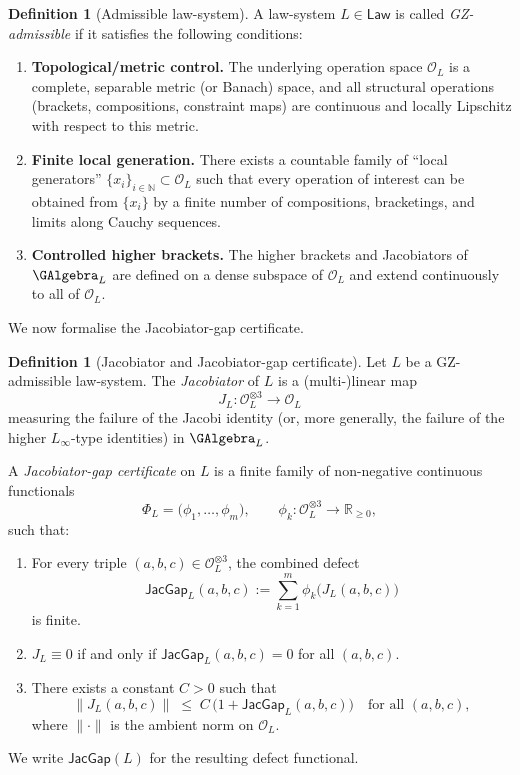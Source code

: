 \documentclass[11pt]{book}
\theoremstyle{plain}
\theoremstyle{definition}
\newtheorem{definition}[theorem]{Definition} \theoremstyle{remark}
\begin{document}
\begin{definition}[Admissible law-system]
A law-system \(L\in\mathsf{Law}\) is called
\emph{GZ-admissible} if it satisfies the following conditions:
\begin{enumerate}
  \item[(i)] \textbf{Topological/metric control.}
    The underlying operation space \(\mathcal{O}_L\) is a complete,
    separable metric (or Banach) space, and all structural operations
    (brackets, compositions, constraint maps) are continuous and
    locally Lipschitz with respect to this metric.
  \item[(ii)] \textbf{Finite local generation.}
    There exists a countable family of ``local generators''
    \(\{x_i\}_{i\in\mathbb{N}}\subset\mathcal{O}_L\) such that every
    operation of interest can be obtained from \(\{x_i\}\) by a finite
    number of compositions, bracketings, and limits along Cauchy
    sequences.
  \item[(iii)] \textbf{Controlled higher brackets.}
    The higher brackets and Jacobiators of \(\GAlgebra_L\) are defined
    on a dense subspace of \(\mathcal{O}_L\) and extend continuously
    to all of \(\mathcal{O}_L\).
\end{enumerate}
\end{definition}



We now formalise the Jacobiator-gap certificate.

\begin{definition}[Jacobiator and Jacobiator-gap certificate]
Let \(L\) be a GZ-admissible law-system.  The
\emph{Jacobiator} of \(L\) is a (multi-)linear map
\[
  J_L : \mathcal{O}_L^{\otimes 3} \longrightarrow \mathcal{O}_L
\]
measuring the failure of the Jacobi identity (or, more generally, the
failure of the higher \(L_\infty\)-type identities) in \(\GAlgebra_L\).

A \emph{Jacobiator-gap certificate} on \(L\) is a finite family of
non-negative continuous functionals
\[
  \Phi_L = \bigl(\phi_1,\dots,\phi_m\bigr),\qquad
  \phi_k : \mathcal{O}_L^{\otimes 3}\to\mathbb{R}_{\ge 0},
\]
such that:
\begin{enumerate}
  \item[(a)] For every triple \((a,b,c)\in\mathcal{O}_L^{\otimes 3}\),
    the combined defect
    \[
      \mathsf{JacGap}_L(a,b,c)
      := \sum_{k=1}^m \phi_k\bigl(J_L(a,b,c)\bigr)
    \]
    is finite.
  \item[(b)] \(J_L\equiv 0\) if and only if
    \(\mathsf{JacGap}_L(a,b,c)=0\) for all \((a,b,c)\).
  \item[(c)] There exists a constant \(C>0\) such that
    \[
      \|J_L(a,b,c)\|
      \;\le\;
      C\,\bigl(1+\mathsf{JacGap}_L(a,b,c)\bigr)
      \quad\text{for all }(a,b,c),
    \]
    where \(\|\cdot\|\) is the ambient norm on \(\mathcal{O}_L\).
\end{enumerate}
We write \(\mathsf{JacGap}(L)\) for the resulting defect functional.
\end{definition}
\end{document}
